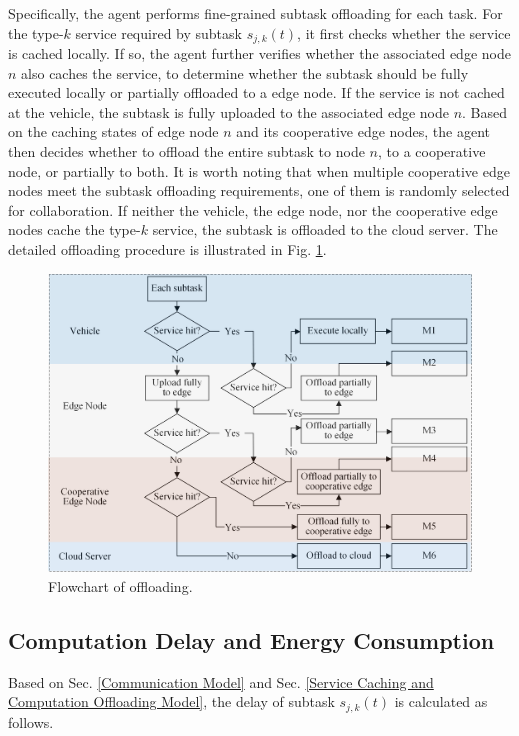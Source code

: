 \documentclass[lettersize,journal]{IEEEtran}
\begin{document}
Specifically, the agent performs fine-grained subtask offloading for each task. For the type-$k$ service required by subtask $s_{j,k}(t)$, it first checks whether the service is cached locally. If so, the agent further verifies whether the associated edge node $n$ also caches the service, to determine whether the subtask should be fully executed locally  or partially offloaded to a edge node.
If the service is not cached at the vehicle, the subtask is fully uploaded to the associated edge node $n$. Based on the caching states of edge node $n$ and its cooperative edge nodes, the agent then decides whether to offload the entire subtask to node $n$, to a cooperative node, or partially to both.
It is worth noting that when multiple cooperative edge nodes meet the subtask offloading requirements, one of them is randomly selected for collaboration.
If neither the vehicle, the edge node, nor the cooperative edge nodes cache the type-$ k $ service, the subtask is offloaded to the cloud server.
The detailed offloading procedure is illustrated in Fig. \ref{fig: flowchart}.
\begin{figure}[!t]
	\centering
	\includegraphics[width=6in]{flowchart}
	\caption{Flowchart of  offloading.}
	\label{fig: flowchart}
\end{figure}

\subsection{Computation Delay and Energy Consumption}
\label{Computation Delay and Energy Consumption}
Based on Sec. \ref{Communication Model} and Sec. \ref{Service Caching and Computation Offloading Model}, the delay of subtask $ s_{j,k}(t) $ is calculated as follows. 
\end{document}
